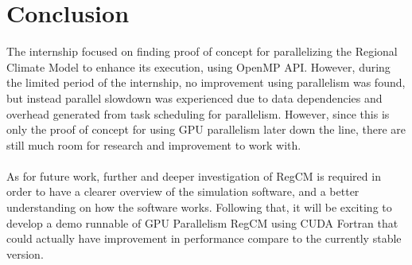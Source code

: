 \chapter{Conclusion}

The internship focused on finding proof of concept for parallelizing the Regional Climate Model to enhance its execution, using OpenMP API. However, during the limited period of the internship, no improvement using parallelism was found, but instead parallel slowdown was experienced due to data dependencies and overhead generated from task scheduling for parallelism. However, since this is only the proof of concept for using GPU parallelism later down the line, there are still much room for research and improvement to work with.\\
~\\
As for future work, further and deeper investigation of RegCM is required in order to have a clearer overview of the simulation software, and a better understanding on how the software works. Following that, it will be exciting to develop a demo runnable of GPU Parallelism RegCM using CUDA Fortran that could actually have improvement in performance compare to the currently stable version.
